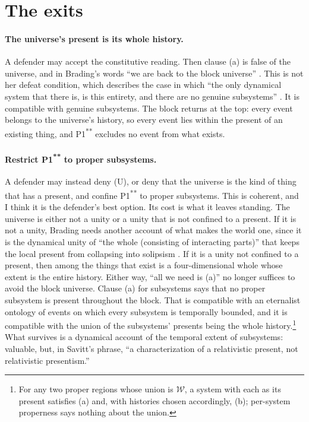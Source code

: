 \documentclass[11pt]{article}
\newcommand{\W}{\mathcal W}
\begin{document}
\section{The exits}\label{sec:exits}

\paragraph{The universe's present is its whole history.} A defender may accept the
constitutive reading. Then clause (a) is false of the universe, and in Brading's
words ``we are back to the block universe'' \citep[p.~17]{Brading2015}. This is
not her defeat condition, which describes the case in which ``the only dynamical
system that there is, is this entirety, and there are no genuine subsystems''
\citep[p.~1109]{Brading2013}. It is compatible with genuine subsystems. The block
returns at the top: every event belongs to the universe's history, so every event
lies within the present of an existing thing, and P1\textsuperscript{**} excludes
no event from what exists.

\paragraph{Restrict P1\textsuperscript{**} to proper subsystems.} A defender may
instead deny (U), or deny that the universe is the kind of thing that has a
present, and confine P1\textsuperscript{**} to proper subsystems. This is
coherent, and I think it is the defender's best option. Its cost is what it leaves
standing. The universe is either not a unity or a unity that is not confined to a
present. If it is not a unity, Brading needs another account of what makes the
world one, since it is the dynamical unity of ``the whole (consisting of
interacting parts)'' that keeps the local present from collapsing into solipsism
\citep[p.~1110]{Brading2013}. If it is a unity not confined to a present, then
among the things that exist is a four-dimensional whole whose extent is the
entire history. Either way, ``all we need is (a)'' no longer suffices to avoid
the block universe. Clause (a) for subsystems says that no proper subsystem is
present throughout the block. That is compatible with an eternalist ontology of
events on which every subsystem is temporally bounded, and it is compatible with
the union of the subsystems' presents being the whole history.\footnote{For any
two proper regions whose union is $\W$, a system with each as its present satisfies
(a) and, with histories chosen accordingly, (b); per-system properness says
nothing about the union.} What survives is a dynamical account of the temporal
extent of subsystems: valuable, but, in Savitt's phrase, ``a characterization of a
relativistic present, not relativistic presentism.''
\end{document}

